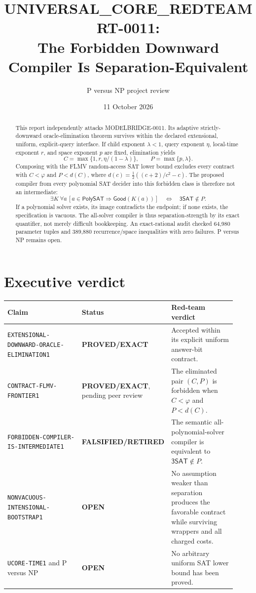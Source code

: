 \documentclass[11pt]{article}
\title{UNIVERSAL\_CORE\_REDTEAM RT-0011:\\
The Forbidden Downward Compiler Is Separation-Equivalent}
\author{P versus NP project review}
\date{11 October 2026}
\newcommand{\SAT}{\mathsf{3SAT}}
\newcommand{\PolySAT}{\mathsf{PolySAT}}
\newcommand{\EXACT}{\textbf{PROVED/EXACT}}
\newcommand{\OPEN}{\textbf{OPEN}}
\newcommand{\RETIRED}{\textbf{FALSIFIED/RETIRED}}
\begin{document}
\maketitle

\begin{abstract}
This report independently attacks MODELBRIDGE-0011.  Its adaptive
strictly-downward oracle-elimination theorem survives within the declared
extensional, uniform, explicit-query interface.  If child exponent
$\lambda<1$, query exponent $\eta$, local-time exponent $r$, and space
exponent $p$ are fixed, elimination yields
\[
 C=\max\{1,r,\eta/(1-\lambda)\},\qquad P=\max\{p,\lambda\}.
\]
Composing with the FLMV random-access SAT lower bound excludes every contract
with $C<\varphi$ and $P<d(C)$, where
$d(c)=\frac12((c+2)/c^2-c)$.  The proposed compiler from every polynomial SAT
decider into this forbidden class is therefore not an intermediate:
\[
 \exists K\ \forall a\,
 [a\in\PolySAT\Rightarrow\mathsf{Good}(K(a))]
 \quad\Longleftrightarrow\quad \SAT\notin P.
\]
If a polynomial solver exists, its image contradicts the endpoint; if none
exists, the specification is vacuous.  The all-solver compiler is thus
separation-strength by its exact quantifier, not merely difficult
bookkeeping.  An exact-rational audit checked 64,980 parameter tuples and
389,880 recurrence/space inequalities with zero failures.  P versus NP
remains open.
\end{abstract}

\section{Executive verdict}

\begin{center}\small
\begin{tabular}{p{0.38\linewidth}p{0.20\linewidth}p{0.34\linewidth}}
\toprule Claim & Status & Red-team verdict\\ \midrule
\texttt{EXTENSIONAL-DOWNWARD-ORACLE-ELIMINATION1} & \EXACT &
Accepted within its explicit uniform answer-bit contract.\\
\texttt{CONTRACT-FLMV-FRONTIER1} & \EXACT, pending peer review &
The eliminated pair $(C,P)$ is forbidden when $C<\varphi$ and $P<d(C)$.\\
\texttt{FORBIDDEN-COMPILER-IS-INTERMEDIATE1} & \RETIRED &
The semantic all-polynomial-solver compiler is equivalent to $\SAT\notin P$.\\
\texttt{NONVACUOUS-INTENSIONAL-BOOTSTRAP1} & \OPEN &
No assumption weaker than separation produces the favorable contract while
surviving wrappers and all charged costs.\\
\texttt{UCORE-TIME1} and P versus NP & \OPEN &
No arbitrary uniform SAT lower bound has been proved.\\
\bottomrule
\end{tabular}
\end{center}
\end{document}
